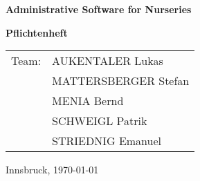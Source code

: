 \thispagestyle{empty}

\begin{center}
  \textbf{\LARGE Administrative Software for Nurseries}
\end{center}
\vspace{10cm}

\begin{flushleft}
\textbf{\LARGE Pflichtenheft}

\vspace{3cm}
\begin{table}[htbp]
\Large
\begin{tabular}{cl}
   Team: & AUKENTALER Lukas \\ 
   & MATTERSBERGER Stefan \\ 
   & MENIA Bernd \\
   & SCHWEIGL Patrik \\
   & STRIEDNIG Emanuel \\
 \end{tabular}
\end{table}
\end{flushleft}

\large Innsbruck, \today

\vfill